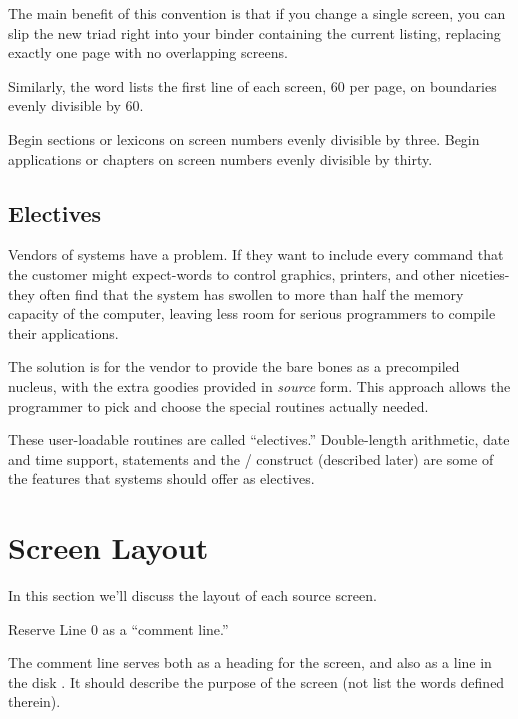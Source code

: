 The main benefit of this convention is that if you change a single
screen, you can slip the new triad right into your binder containing
the current listing, replacing exactly one page with no overlapping
screens.

Similarly, the word  lists the first line of each screen,
60 per page, on boundaries evenly divisible by 60.

%
\begin{tip}
Begin sections or lexicons on screen numbers evenly divisible by three.
Begin applications or chapters on screen numbers evenly divisible by
thirty.
\end{tip}%

\subsection{Electives}%
Vendors of \Forth{} systems have a problem.  If they want to include
every command that the customer might expect-words to control
graphics, printers, and other niceties-they often find that the system
has swollen to more than half the memory capacity of the computer,
leaving less room for serious programmers to compile their
applications.

The solution is for the vendor to provide the bare bones as a
precompiled nucleus, with the extra goodies provided in \emph{source} form.
This approach allows the programmer to pick and choose the special
routines actually needed.

These user-loadable routines are called ``electives.'' Double-length
arithmetic, date and time support,  statements and the
/\hy {} construct (described later) are some of
the features that \Forth{} systems should offer as electives.%
%

\section{Screen Layout}%
%

In this section we'll discuss the layout of each source screen.

%
\begin{tip}
Reserve Line 0 as a ``comment line.''
\end{tip}
The comment line serves both as a heading for the screen, and also as
a line in the disk .  It should describe the purpose of
the screen (not list the words defined therein).

